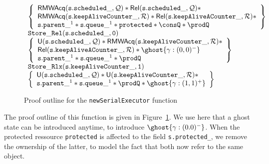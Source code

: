 \begin{figure}
\begin{equation*}
\begin{array}{l}
	\left\{
			\begin{array}{l}
				\mathsf{RMWAcq}(\mathtt{s.scheduled\_}, \mathcal{Q}) * \mathsf{Rel}(\mathtt{s.scheduled\_}, \mathcal{Q}) * \\ 
					\mathsf{RMWAcq}(\mathtt{s.keepAliveCounter\_}, \mathcal{R}) * \mathsf{Rel}(\mathtt{s.keepAliveACounter\_}, \mathcal{R}) * \\
					 \mathtt{s.parent\_}^1 * \mathtt{s.queue\_}^1 * \mathtt{protected} * \consQ * \prodQ
			\end{array} \right\} \\

			\mathtt{Store\_Rel(s.scheduled\_, 0)} \\

	\left\{
			\begin{array}{l}
				\mathsf{U}(\mathtt{s.scheduled\_}, \mathcal{Q}) * \mathsf{RMWAcq}(\mathtt{s.keepAliveCounter\_}, \mathcal{R}) * \\
					\mathsf{Rel}(\mathtt{s.keepAliveACounter\_}, \mathcal{R}) * \ghost{\gamma : (0, 0)^-}\\
				\mathtt{s.parent\_}^1 * \mathtt{s.queue\_}^1 * \prodQ
			\end{array} \right\} \\

			\mathtt{Store\_Rlx(s.keepAliveCounter\_, 1)} \\

	\left\{
			\begin{array}{l}
				\mathsf{U}(\mathtt{s.scheduled\_}, \mathcal{Q}) * \mathsf{U}(\mathtt{s.keepAliveCounter\_}, \mathcal{R}) * \\
					\mathtt{s.parent\_}^1 * \mathtt{s.queue\_}^1 * \prodQ * \ghost{\gamma : (1, 1)^+}
			\end{array} \right\} \\



\end{array}
\end{equation*}

		\caption{Proof outline for the \texttt{newSerialExecutor} function}
		\label{fig:proofNew}

\end{figure}

The proof outline of this function is given in Figure~\ref{fig:proofNew}. We use here that a ghost state can be introduced anytime, to introduce $\ghost{\gamma: (0. 0)^-}$. When the protected ressource \texttt{protected} is affected to the field \texttt{s.protected\_}, we remove the ownership of the latter, to model the fact that both now refer to the same object.


